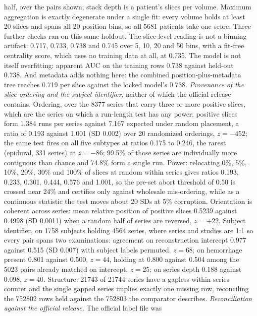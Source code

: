\documentclass[11pt,letterpaper]{article}
\begin{document}
\begin{singlespace}
{half, over the pairs shown; stack depth is a patient's slices per volume.
Maximum aggregation is exactly degenerate under a single fit: every volume holds
at least 20 slices and spans all 20 position bins, so all \num{5681} patients
take one score.
Three further checks ran on this same holdout. The slice-level reading is not a
binning artifact: 0.717, 0.733, 0.738 and 0.745 over 5, 10, 20 and 50 bins, with
a fit-free centrality score, which uses no training data at all, at 0.735. The
model is not itself overfitting: apparent AUC on the training rows 0.738 against
held-out 0.738. And metadata adds nothing here: the combined position-plus-metadata
tree reaches 0.719 per slice against the locked model's 0.738.
\emph{Provenance of the slice ordering and the subject identifier}, neither of
which the official release contains. Ordering, over the \num{8377} series that
carry three or more positive slices, which are the series on which a run-length
test has any power: positive slices form 1.384 runs
per series against 7.167 expected under random placement, a ratio of 0.193
against 1.001 (SD 0.002) over 20 randomized orderings, $z=-452$; the same test
fires on all five subtypes at ratios 0.175 to 0.246, the rarest (epidural, 331
series) at $z=-86$; 99.5\% of those series are individually more contiguous than
chance and 74.8\% form a single run. Power: relocating 0\%, 5\%, 10\%, 20\%,
30\% and 100\% of slices at random within series gives ratios 0.193, 0.233,
0.301, 0.444, 0.576 and 1.001, so the pre-set abort threshold of 0.50 is crossed
near 24\% and certifies only against wholesale mis-ordering, while as a
continuous statistic the test moves about 20 SDs at 5\% corruption. Orientation
is coherent across series: mean relative position of positive slices 0.5239
against 0.4998 (SD 0.0011) when a random half of series are reversed, $z=+22$.
Subject identifier, on \num{1758} subjects holding \num{4564} series, where
series and studies are 1:1 so every pair spans two examinations: agreement on
reconstruction intercept 0.977 against 0.515 (SD 0.007) with subject labels
permuted, $z=68$; on hemorrhage present 0.801 against 0.500, $z=44$, holding at
0.800 against 0.504 among the \num{5023} pairs already matched on intercept,
$z=25$; on series depth 0.188 against 0.098, $z=40$. Structure: \num{21743} of
\num{21744} series have a gapless within-series counter and the single gapped
series implies exactly one missing row, reconciling the \num{752802} rows held
against the \num{752803} the comparator describes.
\emph{Reconciliation against the official release.} The official label file was
}
\end{singlespace}
\end{document}
